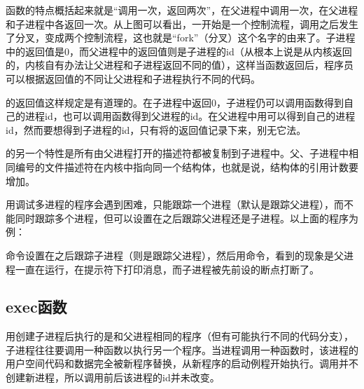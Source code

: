 函数的特点概括起来就是“调用一次，返回两次”，在父进程中调用一次，在父进程和子进程中各返回一次。从上图可以看出，一开始是一个控制流程，调用之后发生了分叉，变成两个控制流程，这也就是“fork”（分叉）这个名字的由来了。子进程中的返回值是0，而父进程中的返回值则是子进程的id（从根本上说是从内核返回的，内核自有办法让父进程和子进程返回不同的值），这样当函数返回后，程序员可以根据返回值的不同让父进程和子进程执行不同的代码。



的返回值这样规定是有道理的。在子进程中返回0，子进程仍可以调用函数得到自己的进程id，也可以调用函数得到父进程的id。在父进程中用可以得到自己的进程id，然而要想得到子进程的id，只有将的返回值记录下来，别无它法。



的另一个特性是所有由父进程打开的描述符都被复制到子进程中。父、子进程中相同编号的文件描述符在内核中指向同一个结构体，也就是说，结构体的引用计数要增加。



用调试多进程的程序会遇到困难，只能跟踪一个进程（默认是跟踪父进程），而不能同时跟踪多个进程，但可以设置在之后跟踪父进程还是子进程。以上面的程序为例：




命令设置在之后跟踪子进程（则是跟踪父进程），然后用命令，看到的现象是父进程一直在运行，在提示符下打印消息，而子进程被先前设的断点打断了。


\subsection{exec函数}
%


用创建子进程后执行的是和父进程相同的程序（但有可能执行不同的代码分支），子进程往往要调用一种函数以执行另一个程序。当进程调用一种函数时，该进程的用户空间代码和数据完全被新程序替换，从新程序的启动例程开始执行。调用并不创建新进程，所以调用前后该进程的id并未改变。



